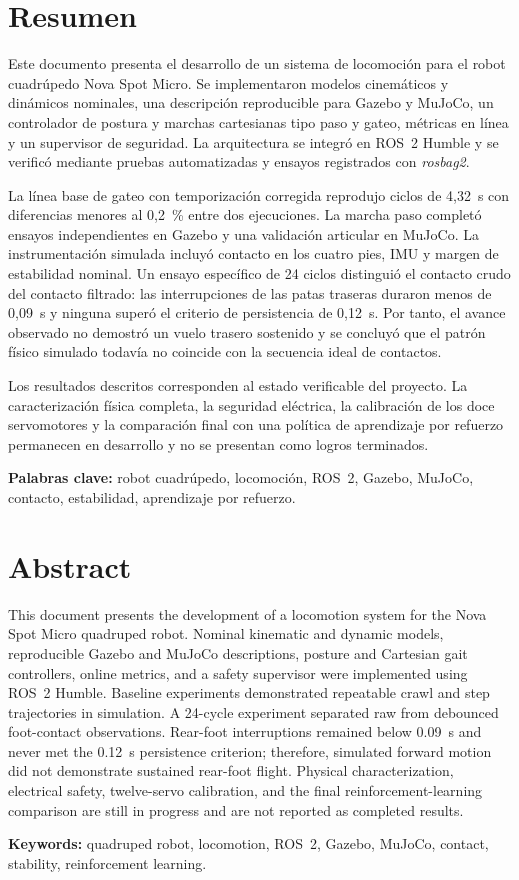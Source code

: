 \chapter*{Resumen}

Este documento presenta el desarrollo de un sistema de locomoción para el
robot cuadrúpedo Nova Spot Micro. Se implementaron modelos cinemáticos y
dinámicos nominales, una descripción reproducible para Gazebo y MuJoCo, un
controlador de postura y marchas cartesianas tipo paso y gateo, métricas en
línea y un supervisor de seguridad. La arquitectura se integró en ROS~2 Humble
y se verificó mediante pruebas automatizadas y ensayos registrados con
\textit{rosbag2}.

La línea base de gateo con temporización corregida reprodujo ciclos de
4,32~s con diferencias menores al 0,2~\% entre dos ejecuciones. La marcha paso
completó ensayos independientes en Gazebo y una validación articular en MuJoCo.
La instrumentación simulada incluyó contacto en los cuatro pies, IMU y margen
de estabilidad nominal. Un ensayo específico de 24 ciclos distinguió el
contacto crudo del contacto filtrado: las interrupciones de las patas traseras
duraron menos de 0,09~s y ninguna superó el criterio de persistencia de
0,12~s. Por tanto, el avance observado no demostró un vuelo trasero sostenido y
se concluyó que el patrón físico simulado todavía no coincide con la secuencia
ideal de contactos.

Los resultados descritos corresponden al estado verificable del proyecto. La
caracterización física completa, la seguridad eléctrica, la calibración de los
doce servomotores y la comparación final con una política de aprendizaje por
refuerzo permanecen en desarrollo y no se presentan como logros terminados.

\textbf{Palabras clave:} robot cuadrúpedo, locomoción, ROS~2, Gazebo, MuJoCo,
contacto, estabilidad, aprendizaje por refuerzo.

\chapter*{Abstract}

This document presents the development of a locomotion system for the Nova
Spot Micro quadruped robot. Nominal kinematic and dynamic models, reproducible
Gazebo and MuJoCo descriptions, posture and Cartesian gait controllers, online
metrics, and a safety supervisor were implemented using ROS~2 Humble. Baseline
experiments demonstrated repeatable crawl and step trajectories in simulation.
A 24-cycle experiment separated raw from debounced foot-contact observations.
Rear-foot interruptions remained below 0.09~s and never met the 0.12~s
persistence criterion; therefore, simulated forward motion did not demonstrate
sustained rear-foot flight. Physical characterization, electrical safety,
twelve-servo calibration, and the final reinforcement-learning comparison are
still in progress and are not reported as completed results.

\textbf{Keywords:} quadruped robot, locomotion, ROS~2, Gazebo, MuJoCo,
contact, stability, reinforcement learning.
